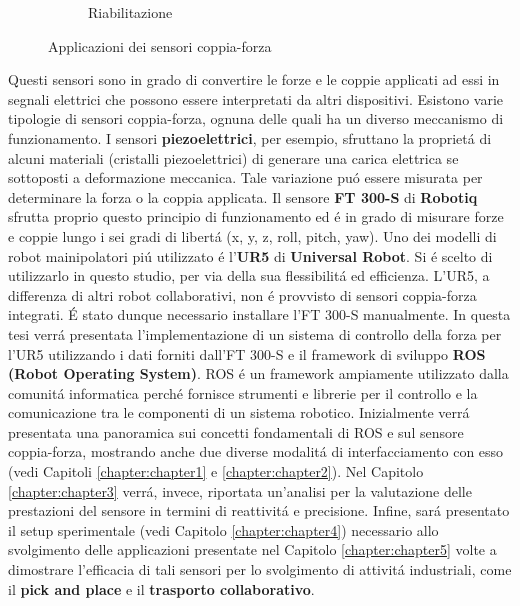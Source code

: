 \begin{figure}[H]
\begin{subfigure}[b]{0.33\textwidth}
        \caption{Riabilitazione}
        \label{fig:rehab}
    \end{subfigure}
    \caption{Applicazioni dei sensori coppia-forza}\label{fig:industrial_applications}
\end{figure}
Questi sensori sono in grado di convertire le forze e le coppie applicati ad essi in segnali elettrici che possono essere 
interpretati da altri dispositivi. 
Esistono varie tipologie di sensori coppia-forza, ognuna delle quali ha un diverso meccanismo di funzionamento. 
I sensori \textbf{piezoelettrici}, per esempio, sfruttano la propriet\'{a} di alcuni materiali (cristalli piezoelettrici) 
di generare una carica elettrica se sottoposti a deformazione meccanica. Tale variazione  
pu\'{o} essere misurata per determinare la forza o la coppia applicata.
Il sensore \textbf{FT 300-S} di \textbf{Robotiq} sfrutta proprio questo principio di funzionamento ed \'{e} in grado di misurare 
forze e coppie lungo i sei gradi di libert\'{a} (x, y, z, roll, pitch, yaw). 
Uno dei modelli di robot mainipolatori pi\'{u} utilizzato \'{e} l'\textbf{UR5} di \textbf{Universal Robot}. Si \'{e} scelto di 
utilizzarlo in questo studio, per via della sua flessibilit\'{a} ed efficienza. 
L'UR5, a differenza di altri robot collaborativi, non \'{e} provvisto di sensori coppia-forza integrati. \'{E} stato dunque necessario 
installare l'FT 300-S manualmente. 
In questa tesi verr\'{a} presentata l'implementazione di un sistema di controllo della forza per l'UR5 utilizzando i dati
forniti dall'FT 300-S e il framework di sviluppo \textbf{ROS (Robot Operating System)}.
ROS \'{e} un framework ampiamente utilizzato dalla comunit\'{a} informatica perch\'{e} fornisce strumenti e librerie 
per il controllo e la comunicazione tra le componenti di un sistema robotico. Inizialmente verr\'{a} presentata una panoramica 
sui concetti fondamentali di ROS e sul sensore coppia-forza, mostrando anche due diverse modalit\'{a} di interfacciamento con esso 
(vedi Capitoli \ref{chapter:chapter1} e \ref{chapter:chapter2}).
Nel Capitolo \ref{chapter:chapter3} verr\'{a}, invece, riportata un'analisi per la valutazione delle prestazioni del sensore in termini di 
reattivit\'{a} e precisione. Infine, sar\'{a} presentato il setup sperimentale (vedi Capitolo \ref{chapter:chapter4}) necessario 
allo svolgimento delle applicazioni presentate nel Capitolo \ref{chapter:chapter5} volte a dimostrare l'efficacia
di tali sensori per lo svolgimento di attivit\'{a} industriali, come il \textbf{pick and place} e il \textbf{trasporto collaborativo}.
